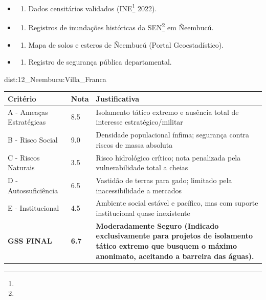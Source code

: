 {\begin{itemize}
\tightlist
\item
  \begin{enumerate}
  \def\labelenumi{\arabic{enumi})}
  \tightlist
  \item
    Dados censitários validados (INE\footnote{\fineINE} 2022).
  \end{enumerate}
\item
  \begin{enumerate}
  \def\labelenumi{\arabic{enumi})}
  \setcounter{enumi}{1}
  \tightlist
  \item
    Registros de inundações históricas da SEN\footnote{\fineSEN} em Ñeembucú.
  \end{enumerate}
\item
  \begin{enumerate}
  \def\labelenumi{\arabic{enumi})}
  \setcounter{enumi}{2}
  \tightlist
  \item
    Mapa de solos e esteros de Ñeembucú (Portal Geoestadístico).
  \end{enumerate}
\item
  \begin{enumerate}
  \def\labelenumi{\arabic{enumi})}
  \setcounter{enumi}{3}
  \tightlist
  \item
    Registro de segurança pública departamental.
  \end{enumerate}
\end{itemize}}{dist:12_Neembucu:Villa_Franca}
\begin{table}[ht!]
\small \begin{tabular}{p{3.0cm}p{0.8cm}p{6.0cm}} \toprule
\textbf{Critério} & \textbf{Nota} & \textbf{Justificativa} \\ \midrule
A - Ameaças Estratégicas & 8.5 & Isolamento tático extremo e ausência total de interesse estratégico/\allowbreak militar \\
B - Risco Social & 9.0 & Densidade populacional ínfima; segurança contra riscos de massa absoluta \\
C - Riscos Naturais & 3.5 & Risco hidrológico crítico; nota penalizada pela vulnerabilidade total a cheias \\
D - Autossuficiência & 6.5 & Vastidão de terras para gado; limitado pela inacessibilidade a mercados \\
E - Institucional & 4.5 & Ambiente social estável e pacífico, mas com suporte institucional quase inexistente \\
\midrule \textbf{GSS FINAL} & \textbf{6.7} & \textbf{Moderadamente Seguro (Indicado exclusivamente para projetos de isolamento tático extremo que busquem o máximo anonimato, aceitando a barreira das águas).} \\ \bottomrule \end{tabular}
\end{table}
